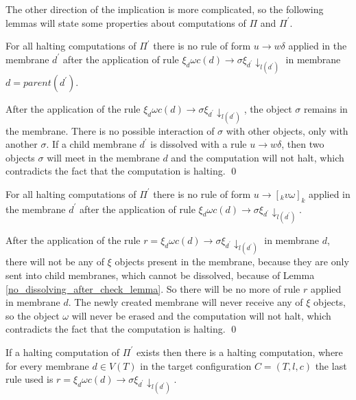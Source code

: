 The other direction of the implication is more complicated, so the following lemmas will state some properties about computations of $\Pi$ and $\Pi^\prime$.

\begin{lemma}
\label{no_dissolving_after_check_lemma}
  For all halting computations of $\Pi^\prime$ there is no rule of form $u\rightarrow w\delta$ applied in the membrane $d^\prime$ after the application of rule $\xi_d\omega c(d)\rightarrow\sigma\xi_{d^\prime}\downarrow_{l(d^\prime)}$ in membrane $d=parent(d^\prime)$.
\end{lemma}

\begin{dokaz}
  After the application of the rule $\xi_d\omega c(d)\rightarrow\sigma\xi_{d^\prime}\downarrow_{l(d^\prime)}$, the object $\sigma$ remains in the membrane. There is no possible interaction of $\sigma$ with other objects, only with another $\sigma$. If a child membrane $d^\prime$ is dissolved with a rule $u\rightarrow w\delta$, then two objects $\sigma$ will meet in the membrane $d$ and the computation will not halt, which contradicts the fact that the computation is halting. \qed
\end{dokaz}

\begin{lemma}
\label{no_creating_new_membrane_after_check_lemma}
  For all halting computations of $\Pi^\prime$ there is no rule of form $u\rightarrow [_k v\omega]_k$ applied in the membrane $d^\prime$ after the application of rule $\xi_d\omega c(d)\rightarrow\sigma\xi_{d^\prime}\downarrow_{l(d^\prime)}$.
\end{lemma}

\begin{dokaz}
  After the application of the rule $r = \xi_d\omega c(d)\rightarrow\sigma\xi_{d^\prime}\downarrow_{l(d^\prime)}$ in membrane $d$, there will not be any of $\xi$ objects present in the membrane, because they are only sent into child membranes, which cannot be dissolved, because of Lemma \ref{no_dissolving_after_check_lemma}. So there will be no more of rule $r$ applied in membrane $d$. The newly created membrane will never receive any of $\xi$ objects, so the object $\omega$ will never be erased and the computation will not halt, which contradicts the fact that the computation is halting. \qed
\end{dokaz}

\begin{lemma}
\label{check_at_last_lemma}
  If a halting computation of $\Pi^\prime$ exists then there is a halting computation, where for every membrane $d\in V(T)$ in the target configuration $C=(T,l,c)$ the last rule used is $r = \xi_d\omega c(d)\rightarrow\sigma\xi_{d^\prime}\downarrow_{l(d^\prime)}$.
\end{lemma}

